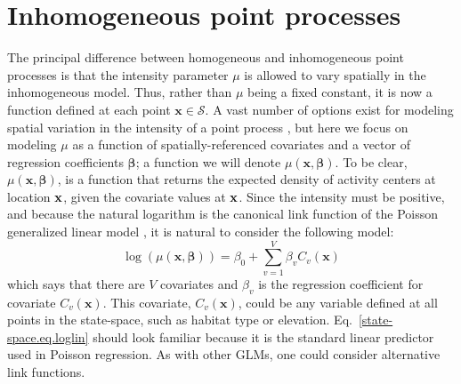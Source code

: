\section{Inhomogeneous point processes}

The principal difference between homogeneous and inhomogeneous point
processes is that the intensity parameter $\mu$ is allowed to vary spatially
in the inhomogeneous model. Thus, rather than $\mu$ being a fixed constant,
it is now a function defined at each point $\mathbf{x} \in
\mathcal{S}$. A vast number of options exist for modeling spatial
variation in the intensity of a point process
\citep{cox:1955,stoyan_penttinen:2000,illian_etal:2008}, but here we
focus on modeling $\mu$ as a function of
spatially-referenced covariates and a vector of regression
coefficients $\bm \beta$; a function we will denote $\mu(\mathbf{x},
\bm{\beta})$. To be clear, $\mu(\mathbf{x}, \bm{\beta})$, is a
function that returns the expected density of activity centers at
location $\bf x$, given the covariate values at $\bf x$.  Since the
intensity must be positive, and because the natural logarithm is the
canonical link function of the Poisson generalized linear model
\citep{mccullagh_nelder:1989}, it is natural to consider the following model:
\begin{equation}
  \log(\mu(\mathbf{x}, {\bm \beta})) = \beta_0 + \sum_{v=1}^V \beta_v C_v(\mathbf{x})%
  \label{state-space.eq.loglin}
\end{equation}
which says that there are $V$ covariates and $\beta_v$ is the
regression coefficient for covariate $C_v(\mathbf{x})$. This
covariate, $C_v(\mathbf{x})$, could be any variable defined at all points
in the state-space, such as habitat type or elevation.
Eq.~\ref{state-space.eq.loglin} should look familiar because it is the
standard linear predictor used in Poisson regression. As with other
GLMs, one could consider alternative link functions.

